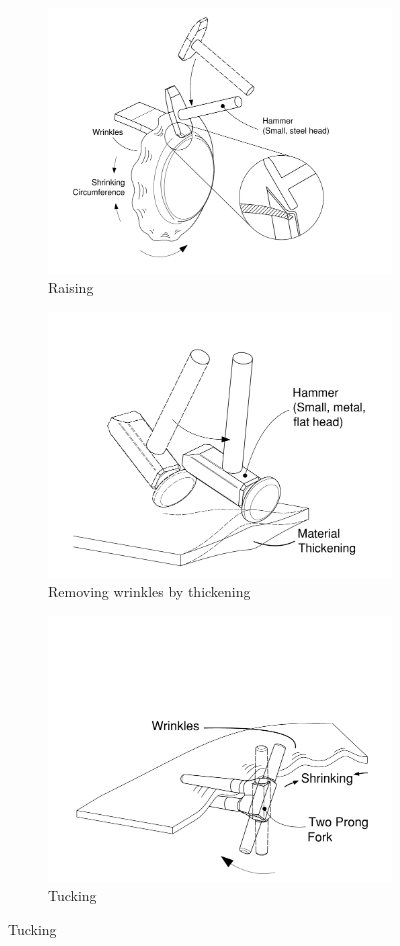 \begin{figure}[]
\begin{subfigure}{.4\textwidth}
  \includegraphics[width=0.9\linewidth]{Images/RaisingTechDrawing.pdf}  
  \caption{Raising}
  \label{fig:Raising1}
\end{subfigure}
%
\begin{subfigure}{0.4\textwidth}
  \centering
  \includegraphics[width=0.8\linewidth]{Images/ThickeningTechDrawing.pdf}  
  \caption{Removing wrinkles by thickening}
  \label{fig:Raising3}
\end{subfigure}
%
\begin{subfigure}{.6\textwidth}
  \centering
  \includegraphics[width=0.8\linewidth]{Images/TuckingTechDrawing.pdf}  
  \caption{Tucking}
  \label{fig:Raising2}
\end{subfigure}
%


\end{figure}
